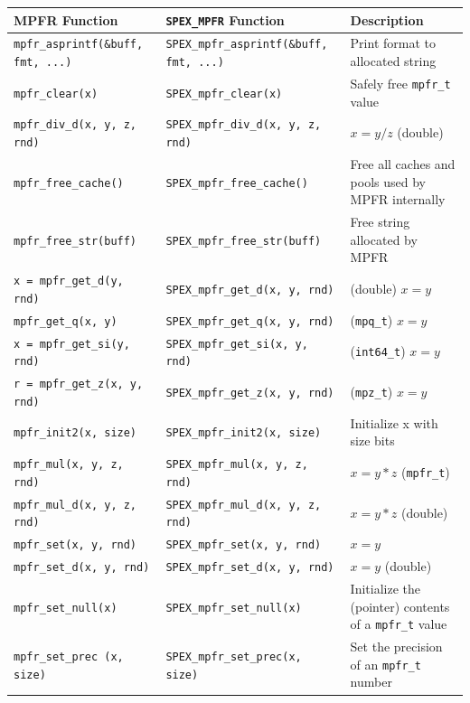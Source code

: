 \documentclass[12pt,oneside]{book}
\theoremstyle{definition}
\newenvironment{SizedCenteredTabular}[2][\small]
    {   
        #1\begin{center}\begin{tabular}{#2}
    }{ 
        \end{tabular}\end{center}
    }
\begin{document}
\thispagestyle{empty}
\noindent
\begin{SizedCenteredTabular}[\scriptsize]{|l|l|p{1.7in}|} \hline
{\bf MPFR Function} & \verb|SPEX_MPFR| {\bf Function} & {\bf Description} \\ \hline\hline
\verb|mpfr_asprintf(&buff, fmt, ...)|& \verb|SPEX_mpfr_asprintf(&buff, fmt, ...)|& Print format to allocated string \\ \hline
\verb|mpfr_clear(x)|& \verb|SPEX_mpfr_clear(x)|& Safely free \verb|mpfr_t| value \\ \hline 
\verb|mpfr_div_d(x, y, z, rnd)|& \verb|SPEX_mpfr_div_d(x, y, z, rnd)|& $x = y/z$ (double) \\ \hline
\verb|mpfr_free_cache()|& \verb|SPEX_mpfr_free_cache()|& Free all caches and pools used by MPFR internally \\ \hline
\verb|mpfr_free_str(buff)|& \verb|SPEX_mpfr_free_str(buff)|& Free string allocated by MPFR \\ \hline
\verb|x = mpfr_get_d(y, rnd)|& \verb|SPEX_mpfr_get_d(x, y, rnd)|& (double) $x = y$\\ \hline
\verb|mpfr_get_q(x, y)|& \verb|SPEX_mpfr_get_q(x, y, rnd)|& (\verb|mpq_t|) $x = y$\\ \hline
\verb|x = mpfr_get_si(y, rnd)|& \verb|SPEX_mpfr_get_si(x, y, rnd)|& (\verb|int64_t|) $x = y$\\ \hline
\verb|r = mpfr_get_z(x, y, rnd)|& \verb|SPEX_mpfr_get_z(x, y, rnd)|& (\verb|mpz_t|) $x = y$\\ \hline
\verb|mpfr_init2(x, size)|& \verb|SPEX_mpfr_init2(x, size)|& Initialize x with size bits \\ \hline
\verb|mpfr_mul(x, y, z, rnd)|& \verb|SPEX_mpfr_mul(x, y, z, rnd)|& $x = y*z$ (\verb|mpfr_t|) \\ \hline
\verb|mpfr_mul_d(x, y, z, rnd)|& \verb|SPEX_mpfr_mul_d(x, y, z, rnd)|& $x = y*z$ (double) \\ \hline
\verb|mpfr_set(x, y, rnd)|& \verb|SPEX_mpfr_set(x, y, rnd)|& $x = y$ \\ \hline
\verb|mpfr_set_d(x, y, rnd)|& \verb|SPEX_mpfr_set_d(x, y, rnd)|& $x = y$ (double) \\ \hline
\verb|mpfr_set_null(x)| & \verb|SPEX_mpfr_set_null(x)| & Initialize the (pointer) contents of a \verb|mpfr_t| value \\ \hline
\verb|mpfr_set_prec (x, size)| & \verb|SPEX_mpfr_set_prec(x, size)| & Set the precision of an \verb|mpfr_t| number \\ \hline

\end{SizedCenteredTabular}
\end{document}
